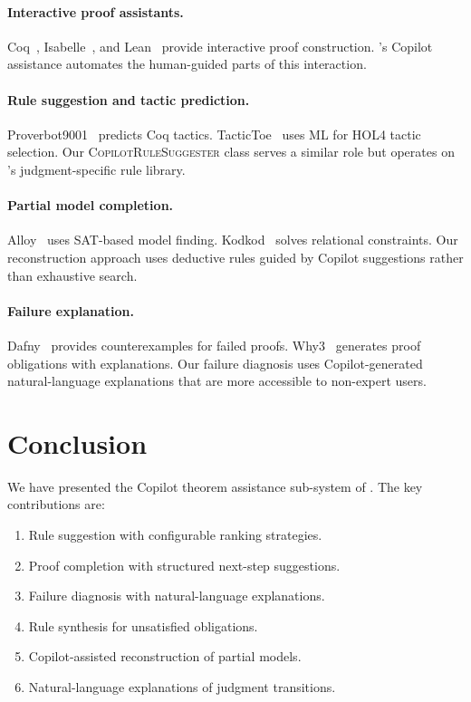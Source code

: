 \documentclass[11pt]{article}
\newcommand{\RuleSugg}{\textsc{CopilotRuleSuggester}}
\begin{document}
\paragraph{Interactive proof assistants.}
Coq~\cite{bertot2004interactive}, Isabelle~\cite{nipkow2002isabelle}, and
Lean~\cite{mathlib2020} provide interactive proof construction.  \JuGeo{}'s
Copilot assistance automates the human-guided parts of this interaction.

\paragraph{Rule suggestion and tactic prediction.}
Proverbot9001~\cite{sanchez2020generating} predicts Coq tactics.
TacticToe~\cite{gauthier2017tactictoe} uses ML for HOL4 tactic selection.
Our \RuleSugg{} class serves a similar role but operates on \JuGeo{}'s
judgment-specific rule library.

\paragraph{Partial model completion.}
Alloy~\cite{jackson2002alloy} uses SAT-based model finding.
Kodkod~\cite{torlak2007kodkod} solves relational constraints.  Our
reconstruction approach uses deductive rules guided by Copilot suggestions
rather than exhaustive search.

\paragraph{Failure explanation.}
Dafny~\cite{leino2010dafny} provides counterexamples for failed proofs.
Why3~\cite{filliatre2013why3} generates proof obligations with explanations.
Our failure diagnosis uses Copilot-generated natural-language explanations
that are more accessible to non-expert users.

\section{Conclusion}\label{sec:conclusion}

We have presented the Copilot theorem assistance sub-system of \JuGeo{}.
The key contributions are:

\begin{enumerate}[leftmargin=2em]
  \item Rule suggestion with configurable ranking strategies.
  \item Proof completion with structured next-step suggestions.
  \item Failure diagnosis with natural-language explanations.
  \item Rule synthesis for unsatisfied obligations.
  \item Copilot-assisted reconstruction of partial models.
  \item Natural-language explanations of judgment transitions.
\end{enumerate}
\end{document}
